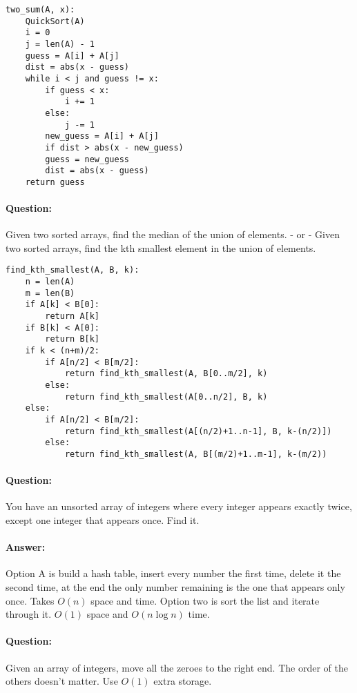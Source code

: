 \documentclass{article}
\begin{document}
\begin{lstlisting}
two_sum(A, x):
    QuickSort(A)
    i = 0
    j = len(A) - 1
    guess = A[i] + A[j]
    dist = abs(x - guess)
    while i < j and guess != x:
        if guess < x:
            i += 1
        else:
            j -= 1
        new_guess = A[i] + A[j]
        if dist > abs(x - new_guess)
        guess = new_guess
        dist = abs(x - guess)
    return guess
\end{lstlisting}

\paragraph{Question:} Given two sorted arrays, find the median of the union of elements. - or - Given two sorted arrays, find the kth smallest element in the union of elements.

\begin{lstlisting}
find_kth_smallest(A, B, k):
    n = len(A)
    m = len(B)
    if A[k] < B[0]:
        return A[k]
    if B[k] < A[0]:
        return B[k]
    if k < (n+m)/2:
        if A[n/2] < B[m/2]:
            return find_kth_smallest(A, B[0..m/2], k)
        else:
            return find_kth_smallest(A[0..n/2], B, k)
    else:
        if A[n/2] < B[m/2]:
            return find_kth_smallest(A[(n/2)+1..n-1], B, k-(n/2)])
        else:
            return find_kth_smallest(A, B[(m/2)+1..m-1], k-(m/2))
\end{lstlisting}

\paragraph{Question:} You have an unsorted array of integers where every integer appears exactly twice, except one integer that appears once. Find it.

\paragraph{Answer:} Option A is build a hash table, insert every number the first time, delete it the second time, at the end the only number remaining is the one that appears only once. Takes \(O(n)\) space and time. Option two is sort the list and iterate through it. \(O(1)\) space and \(O(n \log n)\) time.

\paragraph{Question:} Given an array of integers, move all the zeroes to the right end. The order of the others doesn’t matter. Use \(O(1)\) extra storage.
\end{document}
